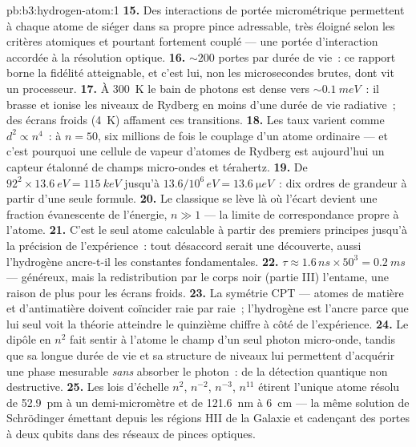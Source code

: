 \begin{solution}{pb:b3:hydrogen-atom:1}
\textbf{15.} Des interactions de portée micrométrique permettent à
chaque atome de siéger dans sa propre pince adressable, très éloigné
selon les critères atomiques et pourtant fortement couplé --- une
portée d'interaction accordée à la résolution optique.
\textbf{16.} $\sim 200$ portes par durée de vie~: ce rapport borne la
fidélité atteignable, et c'est lui, non les microsecondes brutes, dont
vit un processeur.
\textbf{17.} À \qty{300}{K} le bain de photons est dense vers
$\sim\qty{0.1}{meV}$~: il brasse et ionise les niveaux de Rydberg en
moins d'une durée de vie radiative~; des écrans froids (\qty{4}{K})
affament ces transitions.
\textbf{18.} Les taux varient comme $d^2 \propto n^4$~: à $n =
50$, six millions de fois le couplage d'un atome ordinaire ---
et c'est pourquoi une cellule de vapeur d'atomes de Rydberg est
aujourd'hui un capteur étalonné de champs micro-ondes et térahertz.
\textbf{19.} De $92^2 \times \qty{13.6}{eV} = \qty{115}{keV}$
jusqu'à $13.6/10^6\,\unit{eV} = \qty{13.6}{\micro eV}$~: dix ordres de
grandeur à partir d'une seule formule.
\textbf{20.} Le classique se lève là où l'écart devient une fraction
évanescente de l'énergie, $n \gg 1$ --- la limite de correspondance
propre à l'atome.
\textbf{21.} C'est le seul atome calculable à partir des premiers
principes jusqu'à la précision de l'expérience~: tout désaccord serait
une découverte, aussi l'hydrogène ancre-t-il les constantes
fondamentales.
\textbf{22.} $\tau \approx 1.6\,\unit{ns} \times 50^3 =
\qty{0.2}{ms}$ --- généreux, mais la redistribution par le corps noir
(partie III) l'entame, une raison de plus pour les écrans froids.
\textbf{23.} La symétrie CPT --- atomes de matière et d'antimatière
doivent coïncider raie par raie~; l'hydrogène est l'ancre parce que
lui seul voit la théorie atteindre le quinzième chiffre à côté de
l'expérience.
\textbf{24.} Le dipôle en $n^2$ fait sentir à l'atome le champ d'un
seul photon micro-onde, tandis que sa longue durée de vie et sa
structure de niveaux lui permettent d'acquérir une phase mesurable
\emph{sans} absorber le photon~: de la détection quantique non
destructive.
\textbf{25.} Les lois d'échelle $n^2$, $n^{-2}$, $n^{-3}$, $n^{11}$
étirent l'unique atome résolu de \qty{52.9}{pm} à un demi-micromètre
et de \qty{121.6}{nm} à \qty{6}{cm} --- la même solution de
Schrödinger émettant depuis les régions HII de la Galaxie et cadençant
des portes à deux qubits dans des réseaux de pinces optiques.
\end{solution}
